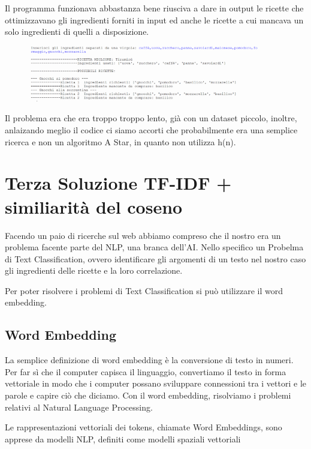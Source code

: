 \documentclass[12pt]{report}
\begin{document}
Il programma funzionava abbastanza bene riusciva a dare in output le ricette che ottimizzavano gli ingredienti forniti in input ed anche le ricette a cui mancava un solo ingredienti di quelli a disposizione. 

\begin{figure}[H]
        \centering
        {\includegraphics[width=0.9\textwidth]{img/img33.jpg}}
\end{figure}

Il problema era che era troppo troppo lento, già con un dataset piccolo, inoltre, anlaizando meglio il codice ci siamo accorti che probabilmente era una semplice ricerca e non un algoritmo A Star, in quanto non utilizza h(n).

\chapter{Terza Soluzione TF-IDF + similiarità del coseno}

Facendo un paio di ricerche sul web abbiamo compreso che il nostro era un problema facente parte del NLP, una branca dell’AI.
Nello specifico un Probelma di Text Classification, ovvero identificare gli argomenti di un testo nel nostro caso gli ingredienti delle ricette e la loro correlazione.

Per poter risolvere i problemi di Text Classification si può utilizzare il word embedding.

\section{Word Embedding} 

La semplice definizione di word embedding è la conversione di testo in numeri. Per far sì che il computer capisca il linguaggio, convertiamo il testo in forma vettoriale in modo che i computer possano sviluppare connessioni tra i vettori e le parole e capire ciò che diciamo. Con il word embedding, risolviamo i problemi relativi al Natural Language Processing.

Le rappresentazioni vettoriali dei tokens, chiamate Word Embeddings, sono apprese da modelli NLP, definiti come modelli spaziali vettoriali
\end{document}
